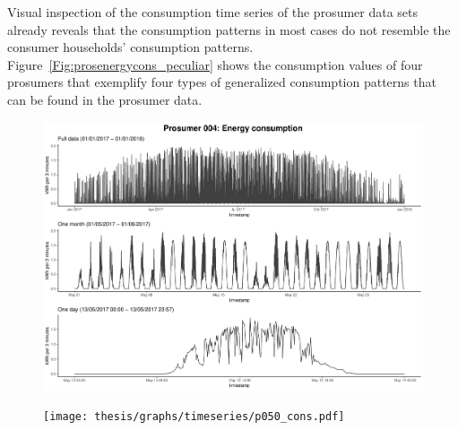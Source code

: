 Visual inspection of the consumption time series of the prosumer data sets already reveals that the consumption patterns in most cases do not resemble the consumer households' consumption patterns. Figure~\ref{Fig:prosenergycons_peculiar} shows the consumption values of four prosumers that exemplify four types of generalized consumption patterns that can be found in the prosumer data.
%
\begin{figure}
    \centering
    \begin{minipage}[h]{\dimexpr.5\textheight-0.15em}
    \includegraphics[width=\textwidth]{thesis/graphs/timeseries/p004_cons.pdf}
    \end{minipage}
    \begin{minipage}[h]{\dimexpr.5\textheight-0.15em}
    \texttt{[image: thesis/graphs/timeseries/p050\_cons.pdf]}
    \end{minipage}\\
    

\end{figure}
